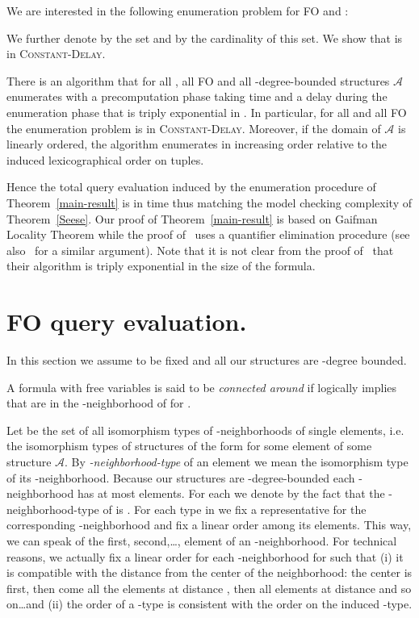 \documentclass{LMCS}
\newcommand{\CDlin}{{\textsc{Constant-}\textsc{Delay}}\xspace}
\newcommand\cA{\ensuremath{{\mathcal A}}\xspace}
\newcommand\FO{\textup{FO}\xspace}
\begin{document}
\newcommand{\olex}{\ensuremath{<_{\text{lex}}}}
We are interested in the following enumeration problem for 
\FO and : 


We further denote by  the set  and by  the cardinality of this set.
We show that  is in \CDlin.

\begin{thm}\label{main-result}
  There is an algorithm that for all , all  \FO
  and all -degree-bounded structures \cA enumerates  with
  a precomputation phase taking time  and
  a delay during the enumeration phase that is triply exponential in .
  In particular, for all  and all  \FO the
  enumeration problem  is in \CDlin. Moreover, if the domain
  of \cA is linearly ordered, the algorithm enumerates  in increasing
  order relative to the induced lexicographical order on tuples.
\end{thm}

Hence the total query evaluation induced by the enumeration procedure of
Theorem~\ref{main-result} is in time 
thus matching the model checking complexity of Theorem~\ref{Seese}.  Our
proof of Theorem~\ref{main-result} is based on Gaifman Locality Theorem while the
proof of~\cite{DurandGrandjean07} uses a quantifier elimination procedure (see
also~\cite{Lindell08} for a similar argument).
Note that it is not clear from the proof of~\cite{DurandGrandjean07} that their
algorithm is triply exponential in the size of the formula.

\section{\FO query evaluation.}

In this section we assume  to be fixed and all our structures
are -degree bounded.

A formula  with  free variables  is said
to be \emph{connected around } if  logically implies
that  are in the -neighborhood of  for .

Let  be the set of all isomorphism types of -neighborhoods of
single elements, i.e. the isomorphism types of structures of the form
 for some element  of some structure \cA. By
\emph{-neighborhood-type} of an element  we mean the isomorphism type
of its -neighborhood. Because our structures are -degree-bounded each
-neighborhood has at most  elements. For each  we
denote by  the fact that the -neighborhood-type of  is . For
each type in  we fix a representative for the corresponding
-neighborhood and fix a linear order among its elements. This way, we can
speak of the first, second,\ldots, element of an -neighborhood. For
technical reasons, we actually fix a linear order for each -neighborhood for
 such that (i) it is compatible with the distance from the center of
the neighborhood: the center is first, then come all the elements at distance
, then all elements at distance  and so on\ldots and (ii) the order of a
-type is consistent with the order on the induced -type.
\end{document}
